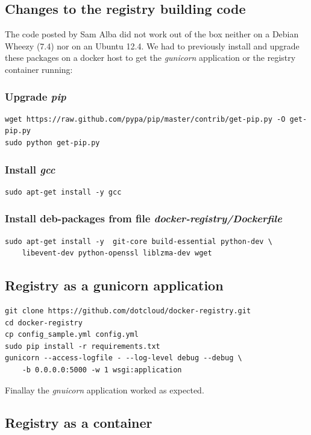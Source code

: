 \documentclass[captions=tableheading]{article}
\begin{document}
\subsection{Changes to the registry building code}
\label{sec-3-3}

The code posted by Sam Alba did not work out of the box neither on a Debian Wheezy (7.4) nor on an Ubuntu 12.4. We had to previously install and upgrade these packages on a docker host to get the \emph{gunicorn} application or the registry container running:
\subsubsection{Upgrade \emph{pip}}
\label{sec-3-3-1}


\begin{verbatim}
wget https://raw.github.com/pypa/pip/master/contrib/get-pip.py -O get-pip.py
sudo python get-pip.py
\end{verbatim}
\subsubsection{Install \emph{gcc}}
\label{sec-3-3-2}


\begin{verbatim}
sudo apt-get install -y gcc
\end{verbatim}
\subsubsection{Install deb-packages from file \emph{docker-registry/Dockerfile}}
\label{sec-3-3-3}


\begin{verbatim}
sudo apt-get install -y  git-core build-essential python-dev \
    libevent-dev python-openssl liblzma-dev wget
\end{verbatim}
\subsection{Registry as a  gunicorn application}
\label{sec-3-4}


\begin{verbatim}
git clone https://github.com/dotcloud/docker-registry.git
cd docker-registry
cp config_sample.yml config.yml
sudo pip install -r requirements.txt
gunicorn --access-logfile - --log-level debug --debug \
    -b 0.0.0.0:5000 -w 1 wsgi:application
\end{verbatim}
Finallay the \emph{gnuicorn} application worked as expected.
\subsection{Registry as a container}
\label{sec-3-5}
\end{document}
